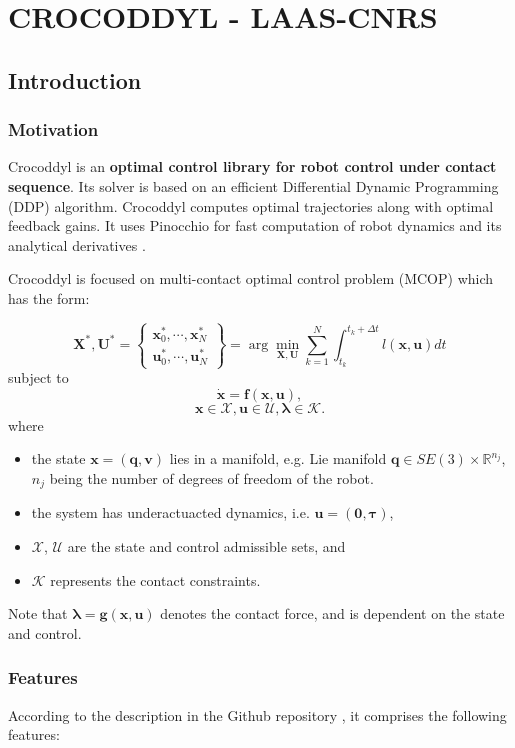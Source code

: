\chapter{CROCODDYL - LAAS-CNRS}\label{chapter1}
\section{Introduction}
\subsection{Motivation}
Crocoddyl is an \textbf{optimal control library for robot control under contact sequence}. Its solver is based on an efficient Differential Dynamic Programming (DDP) algorithm. Crocoddyl computes optimal trajectories along with optimal feedback gains. It uses Pinocchio for fast computation of robot dynamics and its analytical derivatives \cite{crocoddylweb}. 

Crocoddyl is focused on multi-contact optimal control problem (MCOP) which has the form:

$$\mathbf{X}^*,\mathbf{U}^*=
\begin{Bmatrix} \mathbf{x}^*_0,\cdots,\mathbf{x}^*_N \\
				  \mathbf{u}^*_0,\cdots,\mathbf{u}^*_N
\end{Bmatrix} =
\arg\min_{\mathbf{X},\mathbf{U}} \sum_{k=1}^N \int_{t_k}^{t_k+\Delta t} l(\mathbf{x},\mathbf{u})dt$$
subject to
$$ \mathbf{\dot{x}} = \mathbf{f}(\mathbf{x},\mathbf{u}),$$
$$ \mathbf{x}\in\mathcal{X}, \mathbf{u}\in\mathcal{U}, \boldsymbol{\lambda}\in\mathcal{K}.$$
where
\begin{itemize}
\item the state $\mathbf{x}=(\mathbf{q},\mathbf{v})$ lies in a manifold, e.g. Lie manifold $\mathbf{q}\in SE(3)\times \mathbb{R}^{n_j}$, $n_j$ being the number of degrees of freedom of the robot.
\item the system has underactuacted dynamics, i.e. $\mathbf{u}=(\mathbf{0},\boldsymbol{\tau})$,
\item $\mathcal{X}$, $\mathcal{U}$ are the state and control admissible sets, and
\item $\mathcal{K}$ represents the contact constraints.
\end{itemize}

Note that $\boldsymbol{\lambda}=\mathbf{g}(\mathbf{x},\mathbf{u})$ denotes the contact force, and is dependent on the state and control.

\subsection{Features}
According to the description in the Github repository \cite{crocoddylweb}, it comprises the following features:

